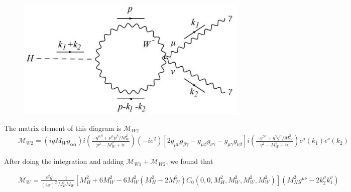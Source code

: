 \documentclass[a4paper,10pt]{article}
\begin{document}
\begin{figure}[h]
\begin{center}
\includegraphics[scale=0.5]{./foto2.jpeg}
\end{center}
\end{figure}
\newline
The matrix element of this diagram is $\mathscr{M}_{W2}$
\begin{eqnarray*}
&&\mathscr{M}_{W2} = (igM_W g_{\alpha\alpha}) i\left(\frac{-g^{\alpha\beta} + p^{\alpha}p^{\beta}/M_W^2}{p^2-M_W^2+i\epsilon}\right) (-ie^2) \left[2g_{\mu\nu}g_{\beta\gamma} - g_{\mu\beta}g_{\nu\gamma}-g_{\mu\gamma}g_{\nu\beta} \right]i\left(\frac{-g^{\gamma\alpha} + q^{\gamma}q^{\alpha}/M_W^2}{q^2-M_W^2+i\epsilon}\right)\epsilon^{\mu}(k_1)\epsilon^{\nu}(k_2)
\end{eqnarray*}

After doing the integration and adding $\mathscr{M}_{W1} + \mathscr{M}_{W2}$, we found that

\begin{eqnarray*}
&&\mathscr{M}_{W} = \frac{e^2g}{(4\pi)^2}\frac{1}{M_H^2M_W}\left[M_H^2+6M_W^2 -6M_W^2(M_H^2-2M_W^2)C_0(0,0,M_H^2,M_W^2,M_W^2,M_W^2)\right](M_H^2g^{\mu\nu}-2k_2^{\mu}k_1^{\nu})
\end{eqnarray*}
\end{document}
